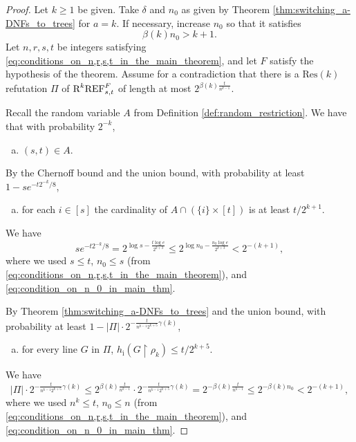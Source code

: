 \documentclass[10pt,a4paper]{article}
\theoremstyle{remark}
\newtheorem*{switching lemma}{Switching Lemma}
\newtheorem*{open problem}{Open Problem}
\theoremstyle{definition}
\begin{document}
\begin{proof}
Let $k \geq 1$ be given. Take $\delta$ and $n_0$ as given by Theorem \ref{thm:switching_a-DNFs_to_trees} for $a=k$. If necessary, increase $n_0$ so that it satisfies 
\begin{equation}
\label{eq:condition_on_n_0_in_main_thm}
\beta(k) n_0 > k + 1.
\end{equation}
Let $n,r,s,t$ be integers satisfying \eqref{eq:conditions_on_n,r,s,t_in_the_main_theorem}, and let $F$ satisfy the hypothesis of the theorem. 
Assume for a contradiction that there is a $\text{Res}(k)$ refutation $\Pi$ of $\textnormal{R}^k\textnormal{REF}^{F}_{s,t}$ of length at most $2^{\beta(k) \frac{t}{n^{k-1}}}$. 

Recall the random variable $A$ from Definition \ref{def:random_restriction}. We have that with probability  $2^{-k}$, 
\begin{enumerate}[(a)]
\item \label{item:s,t_in_A-in_main_theorem} $(s,t) \in A$.
\end{enumerate}

By the Chernoff bound and the union bound, with probability at least $1 - se^{- t2^{-k} / 8} $, 
\begin{enumerate}[(b)]
\item \label{item:A_widely_intersects_levels-in_main_thereom} for each $i \in [s]$ the cardinality of $A \cap (\{i\} \times [t])$ is at least $t/2^{k+1}$. 
\end{enumerate}
We have 
\begin{equation*}
se^{- t2^{-k} / 8} = 2^{\log s - \frac{t \log e}{2^{k+3}}} \leq 2^{\log n_0 - \frac{n_0 \log e}{2^{k+3}}}  < 2^{-(k+1)},
\end{equation*}
where we used $s \leq t$, $n_0 \leq s$ (from \eqref{eq:conditions_on_n,r,s,t_in_the_main_theorem}), and \eqref{eq:condition_on_n_0_in_main_thm}.

By Theorem \ref{thm:switching_a-DNFs_to_trees} and the union bound, with probability at least $1 - |\Pi| \cdot 2^{- \frac{t}{n^{k-1}2^{k+5}} \gamma(k)}$, 
\begin{enumerate}[(c)]
\item \label{item:all_lines_to_trees-in_main_theorem} for every line $G$ in $\Pi$, $h_{\text{i}}(G \! \restriction \! \rho_k) \leq t/2^{k+5}$. 
\end{enumerate}
We have 
\begin{equation*}
 |\Pi| \cdot 2^{- \frac{t}{n^{k-1}2^{k+5}}\gamma(k)} 
 \leq 2^{\beta(k) \frac{t}{n^{k-1}}} \cdot 2^{- \frac{t}{n^{k-1}2^{k+5}} \gamma(k)} 
 = 2^{ - \beta(k) \frac{t}{n^{k-1}}} 
\leq 2^{ - \beta(k) n_0} < 2^{-(k+1)},
\end{equation*}
where we used $n^k \leq t$, $n_0 \leq n$ (from \eqref{eq:conditions_on_n,r,s,t_in_the_main_theorem}), and \eqref{eq:condition_on_n_0_in_main_thm}.


\end{proof}
\end{document}
